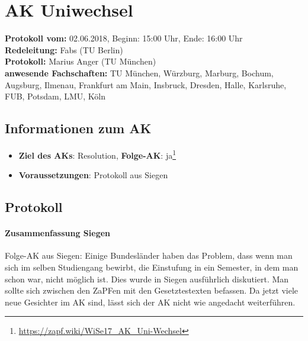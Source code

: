 
\section{AK Uniwechsel}

  \textbf{Protokoll vom:} 02.06.2018, %
  Beginn: 15:00 Uhr,
  Ende: 16:00 Uhr \\
  \textbf{Redeleitung:} Fabs (TU Berlin) \\
  \textbf{Protokoll:} Marius Anger (TU München) \\
  \textbf{anwesende Fachschaften:} TU München, Würzburg, Marburg, Bochum, Augsburg, Ilmenau, Frankfurt am Main, Insbruck, Dresden, Halle, Karlsruhe, FUB, Potsdam, LMU, Köln
\vspace{-5mm}
  \subsection*{Informationen zum AK}
    \begin{itemize}
      \item \textbf{Ziel des AKs}: Resolution, \textbf{Folge-AK}: ja\footnote{\url{https://zapf.wiki/WiSe17_AK_Uni-Wechsel}}
      \item \textbf{Voraussetzungen}: Protokoll aus Siegen
    \end{itemize}

  \subsection*{Protokoll}
      \paragraph{Zusammenfassung Siegen}
        Folge-AK aus Siegen: Einige Bundesländer haben das Problem, dass wenn man sich im selben Studiengang bewirbt, die Einstufung in ein Semester, in dem man schon war, nicht möglich ist.
        Dies wurde in Siegen ausführlich diskutiert. Man sollte sich zwischen den ZaPFen mit den Gesetztestexten befassen. Da jetzt viele neue Gesichter im AK sind, lässt sich der AK nicht wie angedacht weiterführen.

